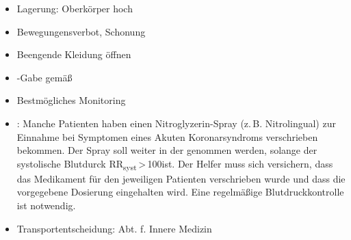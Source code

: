 


{\label{m:akutes-koronarsyndrom-beschwerdefrei}}
{%
\begin{itemize}
    \item Lagerung: Oberkörper hoch
  \item Bewegungensverbot, Schonung
  \item Beengende Kleidung öffnen
    \item {}-Gabe gemäß 
  \item Bestmögliches Monitoring
  \item {}: Manche Patienten haben einen
  Nitroglyzerin-Spray (z.\,B. Nitrolingual{\texttrademark})
  zur Einnahme bei Symptomen eines Akuten Koronarsyndroms
  verschrieben bekommen. Der Spray soll weiter  in der  genommen werden, solange der systolische
  Blutdurck RR\textsubscript{syst}\,{\textgreater}\,100\MmHg*
  ist. Der Helfer muss sich versichern, dass das Medikament
  für den jeweiligen Patienten verschrieben wurde und dass
  die vorgegebene Dosierung eingehalten wird. Eine
  regelmäßige Blutdruckkontrolle ist notwendig.
  \item Transportentscheidung: Abt. f. Innere Medizin
\end{itemize}
}

